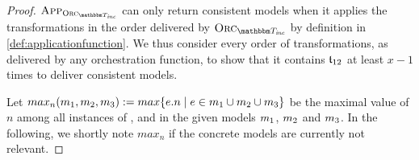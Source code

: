 \begin{proof}
    $\appfunction{\orcfunction{\transformationset{T}_\mathvariable{inc}}}$ can only return consistent models when it applies the transformations in the order delivered by $\orcfunction{\transformationset{T}_\mathvariable{inc}}$ by definition in \autoref{def:applicationfunction}.
    We thus consider every order of transformations, as delivered by any orchestration function, to show that it contains $\mathfrak{t}_{12}$ at least $x-1$ times to deliver consistent models.
    
    Let $max_n(m_{1},m_{2},m_{3}) := max\{ e.n \mid e \in m_{1} \cup m_{2} \cup m_{3} \}$ be the maximal value of $n$ among all instances of ,  and  in the given models $m_{1}$, $m_{2}$ and $m_{3}$. In the following, we shortly note $max_n$ if the concrete models are currently not relevant.


\end{proof}
